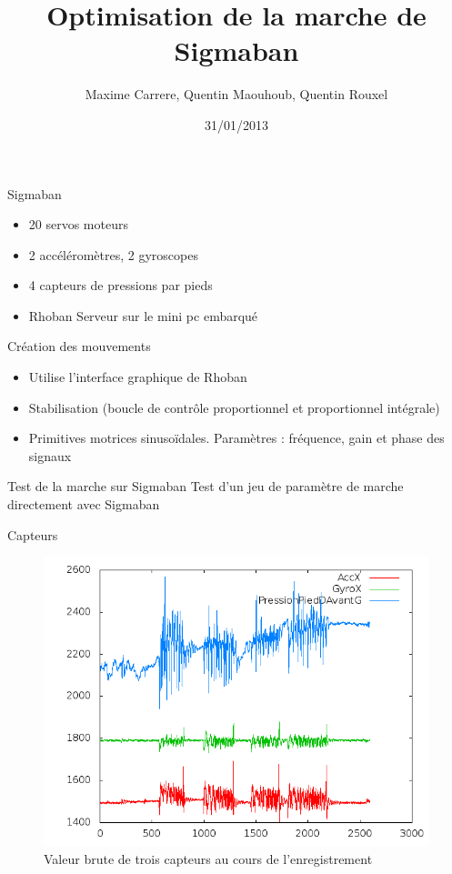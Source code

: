 \documentclass{beamer}
\title[Projet Robotique Autonome]{Optimisation de la marche de Sigmaban}
\author{Maxime Carrere, Quentin Maouhoub, Quentin Rouxel}
\institute{}
\date{31/01/2013}
\begin{document}
\begin{frame}
    \titlepage
\end{frame}

\begin{frame}{Sigmaban}
    \begin{itemize}
        \item 20 servos moteurs
        \item 2 accéléromètres, 2 gyroscopes
        \item 4 capteurs de pressions par pieds
        \item Rhoban Serveur sur le mini pc embarqué
    \end{itemize}
\end{frame}

\begin{frame}{Création des mouvements}
    \begin{itemize}
        \item Utilise l'interface graphique de Rhoban
        \item Stabilisation (boucle de contrôle proportionnel et proportionnel intégrale)
        \item Primitives motrices sinusoïdales. Paramètres : fréquence, gain et phase des signaux
    \end{itemize}
\end{frame}

\begin{frame}{Test de la marche sur Sigmaban}
    Test d'un jeu de paramètre de marche directement avec Sigmaban
\end{frame}

\begin{frame}{Capteurs}
    \begin{figure}[h]
        \includegraphics[scale=0.4]{../report/sensors.png}
        \caption{Valeur brute de trois capteurs au cours de l'enregistrement}
    \end{figure}
\end{frame}
\end{document}
